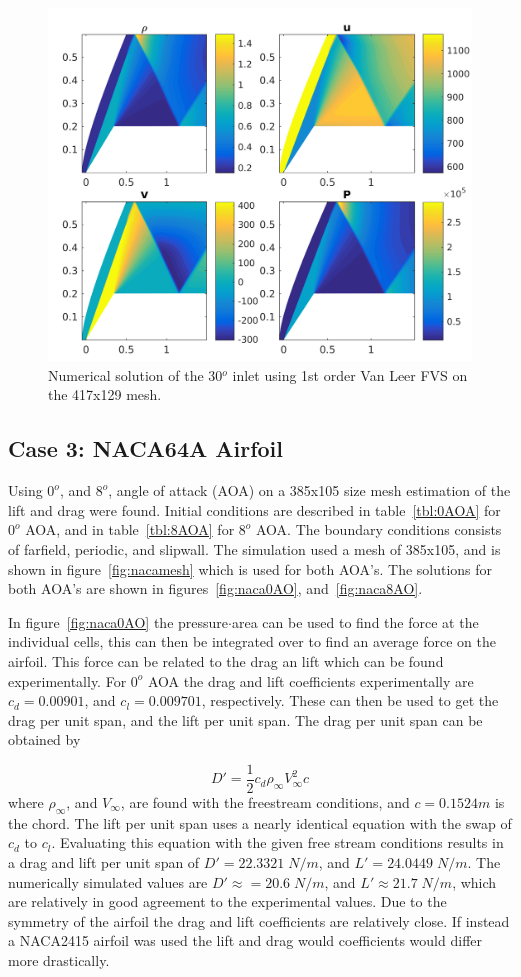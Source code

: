 \documentclass[]{aiaa-tc}%
\begin{document}
\begin{figure}[!htb]
  \centering
  \includegraphics[width=0.75\linewidth]{figures/Inlet_mesh4_Soln}
  \caption{Numerical solution of the 30$^o$ inlet using 1st order Van Leer FVS on the 417x129 mesh.}
  \label{fig:inlet}
\end{figure}

\subsection{Case 3: NACA64A Airfoil}
Using $0^o$, and $8^o$, angle of attack (AOA) on a 385x105 size mesh estimation of the lift and drag were found. Initial conditions are described in table~\ref{tbl:0AOA} for $0^o$ AOA, and in table~\ref{tbl:8AOA} for $8^o$ AOA. The boundary conditions consists of farfield, periodic, and slipwall. The simulation used a mesh of 385x105, and is shown in figure~\ref{fig:nacamesh} which is used for both AOA's. The solutions for both AOA's are shown in figures~\ref{fig:naca0AO}, and~\ref{fig:naca8AO}. 

In figure~\ref{fig:naca0AO} the pressure$\cdot$area  can be used to find the force at the individual cells, this can then be integrated over to find an average force on the airfoil. This force can be related to the drag an lift which can be found experimentally. For $0^o$ AOA the drag and lift coefficients experimentally are $c_d = 0.00901$, and $c_l=0.009701$, respectively. These can then be used to get the drag per unit span, and the lift per unit span. The drag per unit span can be obtained by

\begin{equation}\label{eq:drag}
  D' = \frac{1}{2} c_d \rho_{\infty} V_{\infty}^2 c
\end{equation}
where $\rho_{\infty}$, and $V_{\infty}$, are found with the freestream conditions, and $c=0.1524m$ is the chord. The lift per unit span uses a nearly identical equation with the swap of $c_d$ to $c_l$. Evaluating this equation with the given free stream conditions results in a drag and lift per unit span of $D'=22.3321 \; N/m$, and $L'=24.0449\; N/m$. The numerically simulated values are $D'\approx = 20.6\; N/m$, and $L'\approx21.7\; N/m$, which are relatively in good agreement to the experimental values. Due to the symmetry of the airfoil the drag and lift coefficients are relatively close. If instead a NACA2415 airfoil was used the lift and drag would coefficients would differ more drastically.  
\end{document}
